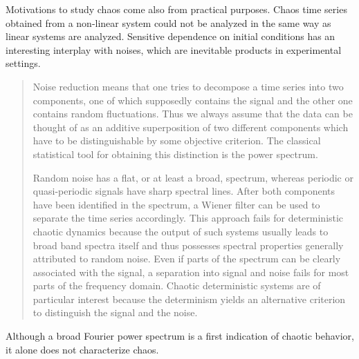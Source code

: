 \documentclass[10pt,twoside,draft]{book}
\begin{document}
Motivations to study chaos come also from practical purposes.
Chaos time series obtained from a non-linear system could not be analyzed in the same way as linear systems are analyzed.
Sensitive dependence on initial conditions has an interesting interplay with noises, which are inevitable products in experimental settings.
\citet[p.51]{kantz-schreiber}
\begin{quotation}
  Noise reduction means that one tries to decompose a time series into two components, one of which supposedly contains the signal and the other one contains random fluctuations.
  Thus we always assume that the data can be thought of as an additive superposition of two different components which have to be distinguishable by some objective criterion.
  The classical statistical tool for obtaining this distinction is the power spectrum.

  Random noise has a flat, or at least a broad, spectrum, whereas periodic or quasi-periodic signals have sharp spectral lines.
  After both components have been identified in the spectrum, a Wiener filter can be used to separate the time series accordingly.
  This approach fails for deterministic chaotic dynamics because the output of such systems usually leads to broad band spectra itself and thus possesses spectral properties generally attributed to random noise.
  Even if parts of the spectrum can be clearly associated with the signal, a separation into signal and noise fails for most parts of the frequency domain.
  Chaotic deterministic systems are of particular interest because the determinism yields an alternative criterion to distinguish the signal and the noise. 
\end{quotation}
Although a broad Fourier power spectrum is a first indication of chaotic behavior, it alone does not characterize chaos. \citep{abarbanel}
\end{document}
